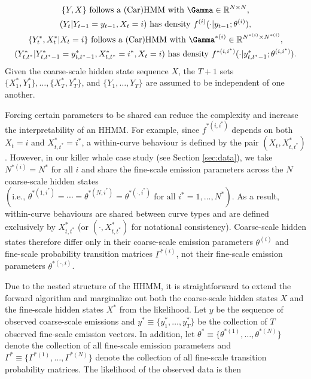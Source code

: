 \begin{gather*}
    \{Y, X\} \text{ follows a (Car)HMM with } \Gamma \in \bbR^{N \times N}, \\
    (Y_t | Y_{t-1} = y_{t-1}, X_t = i) \text{ has density } f^{(i)}(\cdot|y_{t-1};\theta^{(i)}), \\
    \{Y^*_t,X^*_t | X_t = i\} \text{ follows a (Car)HMM with } \Gamma^{*(i)} \in \bbR^{N^{*(i)} \times N^{*(i)}}, \\
    (Y^*_{t,t^*} | Y^*_{t,t^*-1} = y^*_{t,t^*-1}, X^*_{t,t^*} = i^*, X_t = i) \text{ has density } f^{*(i,i^*)}(\cdot|y^{*}_{t,t^*-1};\theta^{(i,i^*)}).
\end{gather*}
Given the coarse-scale hidden state sequence $X$, the $T+1$ sets $\{X_1^*, Y_1^*\}, \ldots, \{X^*_T, Y^*_T\}$, and $\{Y_1,\ldots,Y_T\}$ are assumed to be independent of one another.

Forcing certain parameters to be shared can reduce the complexity and increase the interpretability of an HHMM. For example, since $f^{*(i,i^*)}$ depends on both $X_t = i$ and $X^*_{t,t^*} = i^*$, a within-curve behaviour is defined by the pair $(X_t,X^*_{t,t^*})$. However, in our killer whale case study (see Section \ref{sec:data}), we take $N^{*(i)} = N^*$ for all $i$ and share the fine-scale emission parameters across the $N$ coarse-scale hidden states $\left( \text{i.e., } \theta^{*(1,i^*)} = \cdots = \theta^{*(N,i^*)} = \theta^{*(\cdot,i^*)} \text{ for all } i^* = 1, \ldots, N^* \right)$. As a result, within-curve behaviours are shared between curve types and are defined exclusively by $X^*_{t,t^*}$ (or $(\cdot,X^*_{t,t^*})$ for notational consistency). Coarse-scale hidden states therefore differ only in their coarse-scale emission parameters $\theta^{(i)}$ and fine-scale probability transition matrices $\Gamma^{*(i)}$, not their fine-scale emission parameters $\theta^{*(\cdot,i)}$. 


Due to the nested structure of the HHMM, %
it is straightforward to extend the forward algorithm and marginalize out both the coarse-scale hidden states $X$ and the fine-scale hidden states $X^*$ from the likelihood.
%
Let $y$ be the sequence of observed coarse-scale emissions and
$y^* \equiv \{y^*_1, \ldots,y^*_T\}$ be the collection of $T$ observed fine-scale emission vectors.
%
In addition, let $\theta^* \equiv \{\theta^{*(1)}, \ldots, \theta^{*(N)}\}$ denote the collection of all fine-scale emission parameters and $\Gamma^* \equiv \{\Gamma^{*(1)}, \ldots, \Gamma^{*(N)}\}$ denote the collection of all fine-scale transition probability matrices. The likelihood of the observed data is then

